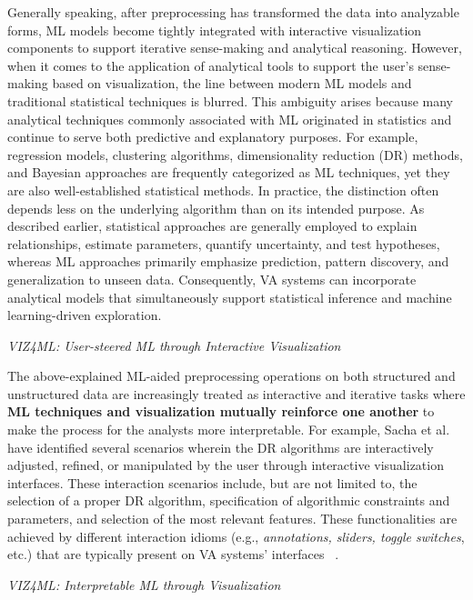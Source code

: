 \documentclass{sfuthesis}
\begin{document}
Generally speaking, after preprocessing has transformed the data into analyzable forms, ML models become tightly integrated with interactive visualization components to support iterative sense-making and analytical reasoning. However, when it comes to the application of analytical tools to support the user’s sense-making based on visualization, the line between modern ML models and traditional statistical techniques is blurred. This ambiguity arises because many analytical techniques commonly associated with ML originated in statistics and continue to serve both predictive and explanatory purposes. For example, regression models, clustering algorithms, dimensionality reduction (DR) methods, and Bayesian approaches are frequently categorized as ML techniques, yet they are also well-established statistical methods. In practice, the distinction often depends less on the underlying algorithm than on its intended purpose. As described earlier, statistical approaches are generally employed to explain relationships, estimate parameters, quantify uncertainty, and test hypotheses, whereas ML approaches primarily emphasize prediction, pattern discovery, and generalization to unseen data. Consequently, VA systems can incorporate analytical models that simultaneously support statistical inference and machine learning-driven exploration.\par
\noindent\textit{VIZ4ML: User-steered ML through Interactive Visualization}\par
The above-explained ML-aided preprocessing operations on both structured and unstructured data are increasingly treated as interactive and iterative tasks where \textbf{ML techniques and visualization mutually reinforce one another} to make the process for the analysts more interpretable. For example, Sacha et al.~\cite{sacha_visual_2016} have identified several scenarios wherein the DR algorithms are interactively adjusted, refined, or manipulated by the user through interactive visualization interfaces. These interaction scenarios include, but are not limited to, the selection of a proper DR algorithm, specification of algorithmic constraints and parameters, and selection of the most relevant features. These functionalities are achieved by different interaction idioms (e.g., \textit{annotations, sliders, toggle switches}, etc.) that are typically present on VA systems’ interfaces ~\cite{sacha_visual_2016}.\par
\noindent\textit{VIZ4ML: Interpretable ML through Visualization}\par
\end{document}
